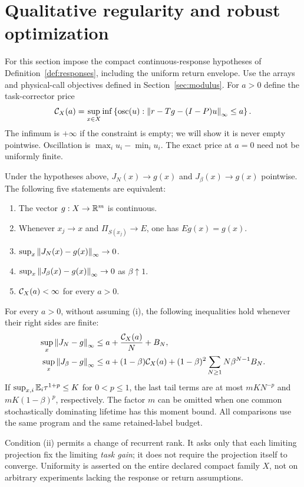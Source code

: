 \section{Qualitative regularity and robust optimization}\label{sec:transfer}
For this section impose the compact continuous-response hypotheses of Definition~\ref{def:responses}, including the uniform return envelope. Use the arrays and physical-call objectives defined in Section~\ref{sec:modulus}.
For $a>0$ define the task-corrector price
\begin{equation}\label{eq:corrector-price}
 \mathcal C_X(a)=\sup_{x\in X}\inf\left\{\operatorname{osc}(u):
  \left\lVert r-Tg-(I-P)u\right\rVert_\infty\le a\right\}.
\end{equation}
The infimum is $+\infty$ if the constraint is empty; we will show it is never empty pointwise. Oscillation is $\max_i u_i-\min_i u_i$. The exact price at $a=0$ need not be uniformly finite.

\begin{theorem}\label{thm:transfer}
Under the hypotheses above, $J_N(x)\to g(x)$ and $J_\beta(x)\to g(x)$ pointwise. The following five statements are equivalent:
\begin{enumerate}
\item[(i)] The vector $g:X\to\mathbb R^m$ is continuous.
\item[(ii)] Whenever $x_j\to x$ and $\Pi_{S(x_j)}\to E$, one has $Eg(x)=g(x)$.
\item[(iii)] $\sup_x\left\lVert J_N(x)-g(x)\right\rVert_\infty\to0$.
\item[(iv)] $\sup_x\left\lVert J_\beta(x)-g(x)\right\rVert_\infty\to0$ as $\beta\uparrow1$.
\item[(v)] $\mathcal C_X(a)<\infty$ for every $a>0$.
\end{enumerate}
For every $a>0$, without assuming (i), the following inequalities hold whenever their right sides are finite:
\begin{align}
 \sup_x\left\lVert J_N-g\right\rVert_\infty
 &\le a+\frac{\mathcal C_X(a)}{N}+B_N,\label{eq:physical-bound}\\
 \sup_x\left\lVert J_\beta-g\right\rVert_\infty
 &\le a+(1-\beta)\mathcal C_X(a)
 +(1-\beta)^2\sum_{N\ge1}N\beta^{N-1}B_N.\label{eq:discount-bound}
\end{align}
If $\sup_{x,i}\mathbb E_i\tau^{1+p}\le K$ for $0<p\le1$, the last tail terms are at most $mKN^{-p}$ and $mK(1-\beta)^p$, respectively. The factor $m$ can be omitted when one common stochastically dominating lifetime has this moment bound. All comparisons use the same program and the same retained-label budget.
\end{theorem}
Condition (ii) permits a change of recurrent rank. It asks only that each limiting projection fix the limiting \emph{task gain}; it does not require the projection itself to converge. Uniformity is asserted on the entire declared compact family $X$, not on arbitrary experiments lacking the response or return assumptions.

